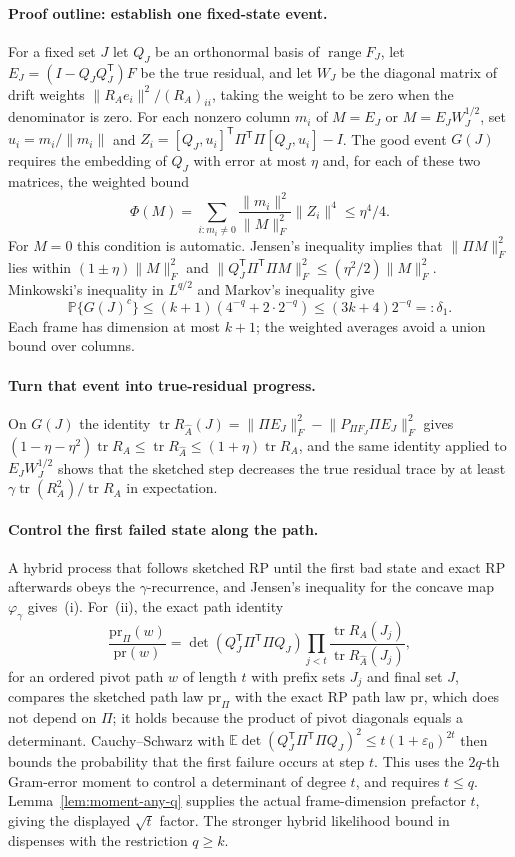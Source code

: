 \documentclass[11pt,a4paper]{article}
\theoremstyle{definition}
\theoremstyle{remark}
\newcommand{\E}{\mathbb E}
\newcommand{\Prob}{\mathbb P}
\newcommand{\tr}{\operatorname{tr}}
\newcommand{\range}{\operatorname{range}}
\newcommand{\eps}{\varepsilon}
\newcommand{\norm}[1]{\lVert#1\rVert}
\newcommand{\1}{\mathbf 1}
\newcommand{\T}{\mathsf T}
\begin{document}
\paragraph{Proof outline: establish one fixed-state event.}
For a fixed set $J$ let $Q_J$ be an orthonormal basis of $\range F_J$,
let $E_J=(I-Q_JQ_J^\T)F$ be the true residual, and let $W_J$ be the
diagonal matrix of drift weights $\norm{R_Ae_i}^2/(R_A)_{ii}$, taking
the weight to be zero when the denominator is zero. For each nonzero
column $m_i$ of $M=E_J$ or $M=E_JW_J^{1/2}$, set
$u_i=m_i/\norm{m_i}$ and
$Z_i=[Q_J,u_i]^\T\Pi^\T\Pi[Q_J,u_i]-I$.
The good event $G(J)$ requires the embedding of $Q_J$ with error at
most $\eta$ and, for each of these two matrices, the weighted bound
\[
 \Phi(M)=\sum_{i:m_i\ne0}\frac{\norm{m_i}^2}{\norm M_F^2}
                    \norm{Z_i}^4\le\eta^4/4.
\]
For $M=0$ this condition is automatic. Jensen's inequality implies
that $\norm{\Pi M}_F^2$ lies within $(1\pm\eta)\norm M_F^2$ and
$\norm{Q_J^\T\Pi^\T\Pi M}_F^2\le(\eta^2/2)\norm M_F^2$.
Minkowski's inequality in $L^{q/2}$ and Markov's inequality give
\[
 \Prob\{G(J)^c\}\le(k+1)(4^{-q}+2\cdot2^{-q})
                  \le(3k+4)2^{-q}=:\delta_1.
\]
Each frame has dimension at most $k+1$; the weighted averages avoid a
union bound over columns.

\paragraph{Turn that event into true-residual progress.}
On $G(J)$ the identity
$\tr R_{\widehat A}(J)=\norm{\Pi E_J}_F^2-\norm{P_{\Pi F_J}\Pi E_J}_F^2$ gives
$(1-\eta-\eta^2)\tr R_A\le\tr R_{\widehat A}\le(1+\eta)\tr R_A$, and the same identity
applied to $E_JW_J^{1/2}$ shows that the sketched step decreases the true
residual trace by at least $\gamma\tr(R_A^2)/\tr R_A$ in expectation. \paragraph{Control the first failed state along the path.}
A hybrid process that follows sketched RP until the first bad state and
exact RP afterwards obeys the $\gamma$-recurrence, and Jensen's inequality
for the concave map $\varphi_\gamma$ gives~(i). For~(ii), the exact path
identity
\[
 \frac{\mathrm{pr}_\Pi(w)}{\mathrm{pr}(w)}=\det(Q_J^\T\Pi^\T\Pi Q_J)\prod_{j<t}
 \frac{\tr R_A(J_j)}{\tr R_{\widehat A}(J_j)},
\]
for an ordered pivot path $w$ of length $t$ with prefix sets $J_j$ and
final set $J$, compares the sketched path law $\mathrm{pr}_\Pi$ with the
exact RP path law $\mathrm{pr}$,
which does not depend on $\Pi$; it holds because the product of pivot
diagonals equals a determinant. Cauchy--Schwarz with
$\E\det(Q_J^\T\Pi^\T\Pi Q_J)^2\le t(1+\eps_0)^{2t}$ then bounds the
probability that the first failure occurs at step $t$. This uses
the $2q$-th Gram-error moment to control a determinant of degree $t$,
and requires $t\le q$. Lemma~\ref{lem:moment-any-q} supplies the actual
frame-dimension prefactor $t$, giving the displayed $\sqrt t$ factor.
The stronger hybrid likelihood bound
in~\cite{RobustRP} dispenses with the restriction $q\ge k$.
\end{document}
